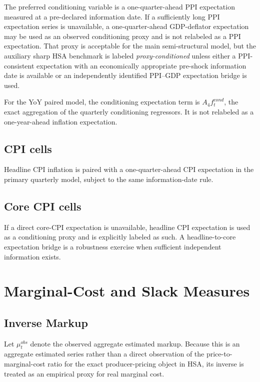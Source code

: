 \documentclass[11pt]{article}
\begin{document}
The preferred conditioning variable is a one-quarter-ahead PPI expectation measured at a pre-declared information date. If a sufficiently long PPI expectation series is unavailable, a one-quarter-ahead GDP-deflator expectation may be used as an observed conditioning proxy and is not relabeled as a PPI expectation. That proxy is acceptable for the main semi-structural model, but the auxiliary sharp HSA benchmark is labeled \emph{proxy-conditioned} unless either a PPI-consistent expectation with an economically appropriate pre-shock information date is available or an independently identified PPI--GDP expectation bridge is used.

For the YoY paired model, the conditioning expectation term is $A_4f_t^{cond}$, the exact aggregation of the quarterly conditioning regressors. It is not relabeled as a one-year-ahead inflation expectation.

\subsection{CPI cells}

Headline CPI inflation is paired with a one-quarter-ahead CPI expectation in the primary quarterly model, subject to the same information-date rule.

\subsection{Core CPI cells}

If a direct core-CPI expectation is unavailable, headline CPI expectation is used as a conditioning proxy and is explicitly labeled as such. A headline-to-core expectation bridge is a robustness exercise when sufficient independent information exists.

\section{Marginal-Cost and Slack Measures}

\subsection{Inverse Markup}

Let $\mu_t^{obs}$ denote the observed aggregate estimated markup. Because this is an aggregate estimated series rather than a direct observation of the price-to-marginal-cost ratio for the exact producer-pricing object in HSA, its inverse is treated as an empirical proxy for real marginal cost.
\end{document}
